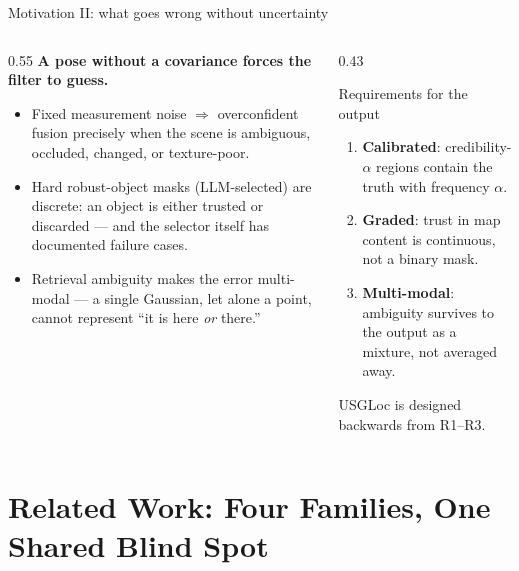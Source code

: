 \documentclass[aspectratio=169,10pt]{beamer}
\newcommand{\method}{USGLoc}
\newcommand{\bad}[1]{{\color{uHigh}#1}}
\begin{document}
\begin{frame}{Motivation II: what goes wrong without uncertainty}
  \begin{columns}[T]
    \begin{column}{0.55\textwidth}
      \textbf{A pose without a covariance forces the filter to guess.}
      \begin{itemize}
        \item Fixed measurement noise $\Rightarrow$ \bad{overconfident
              fusion} precisely when the scene is ambiguous, occluded,
              changed, or texture-poor.
        \item Hard robust-object masks (LLM-selected) are \bad{discrete}:
              an object is either trusted or discarded --- and the selector
              itself has documented failure cases.
        \item Retrieval ambiguity makes the error
              \bad{multi-modal} --- a single Gaussian, let alone a point,
              cannot represent ``it is here \emph{or} there.''
      \end{itemize}
    \end{column}
    \begin{column}{0.43\textwidth}
      \begin{block}{Requirements for the output}
        \small
        \begin{enumerate}
          \item[R1] \textbf{Calibrated}: credibility-$\alpha$ regions
                contain the truth with frequency $\alpha$.
          \item[R2] \textbf{Graded}: trust in map content is continuous,
                not a binary mask.
          \item[R3] \textbf{Multi-modal}: ambiguity survives to the output
                as a mixture, not averaged away.
        \end{enumerate}
      \end{block}
      \vspace{1mm}
      \small \method{} is designed backwards from R1--R3.
    \end{column}
  \end{columns}
\end{frame}

\section{Related Work: Four Families, One Shared Blind Spot}
\end{document}
